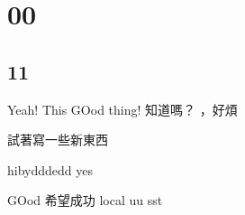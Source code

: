 
\chapter{00}

\section{11}

Yeah!
This
GOod thing! 知道嗎？
，好煩

試著寫一些新東西

hibydddedd
yes

GOod
希望成功
local
uu
sst